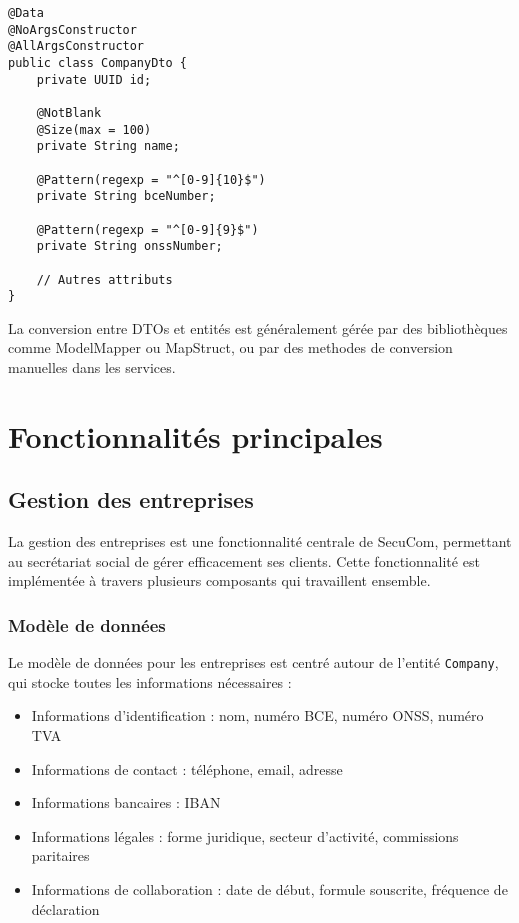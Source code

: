 \begin{lstlisting}
@Data
@NoArgsConstructor
@AllArgsConstructor
public class CompanyDto {
    private UUID id;
    
    @NotBlank
    @Size(max = 100)
    private String name;
    
    @Pattern(regexp = "^[0-9]{10}$")
    private String bceNumber;
    
    @Pattern(regexp = "^[0-9]{9}$")
    private String onssNumber;
    
    // Autres attributs
}
\end{lstlisting}

La conversion entre DTOs et entités est généralement gérée par des bibliothèques comme ModelMapper ou MapStruct, ou par des methodes de conversion manuelles dans les services.

\section{Fonctionnalités principales}

\subsection{Gestion des entreprises}

La gestion des entreprises est une fonctionnalité centrale de SecuCom, permettant au secrétariat social de gérer efficacement ses clients. Cette fonctionnalité est implémentée à travers plusieurs composants qui travaillent ensemble.

\subsubsection{Modèle de données}

Le modèle de données pour les entreprises est centré autour de l'entité \texttt{Company}, qui stocke toutes les informations nécessaires :

\begin{itemize}
  \item Informations d'identification : nom, numéro BCE, numéro ONSS, numéro TVA
  \item Informations de contact : téléphone, email, adresse
  \item Informations bancaires : IBAN
  \item Informations légales : forme juridique, secteur d'activité, commissions paritaires
  \item Informations de collaboration : date de début, formule souscrite, fréquence de déclaration
\end{itemize}

